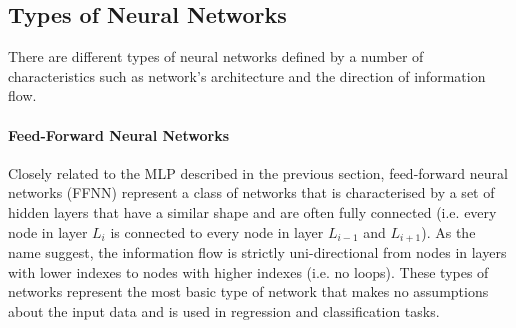 \subsection{Types of Neural Networks}
There are different types of neural networks defined by a number of characteristics such as network's architecture and the direction of information flow. 

\paragraph{Feed-Forward Neural Networks} Closely related to the MLP described in the previous section, feed-forward neural networks (FFNN) represent a class of networks that is characterised by a set of hidden layers that have a similar shape and are often fully connected (i.e. every node in layer $L_i$ is connected to every node in layer $L_{i-1}$ and $L_{i+1}$). As the name suggest, the information flow is strictly uni-directional from nodes in layers with lower indexes to nodes with higher indexes (i.e. no loops). These types of networks represent the most basic type of network that makes no assumptions about the input data and is used in regression and classification tasks.  

